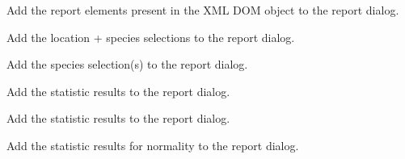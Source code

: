\documentclass[letterpaper,10pt,english]{sphinxmanual}
\begin{document}
\begin{fulllineitems}
\begin{fulllineitems}
\label{setlyze/gui:setlyze.gui.DisplayReport.add_report_elements}
Add the report elements present in the XML DOM object to the
report dialog.

\end{fulllineitems}


\begin{fulllineitems}
\label{setlyze/gui:setlyze.gui.DisplayReport.add_selections}
Add the location + species selections to the report dialog.

\end{fulllineitems}


\begin{fulllineitems}
\label{setlyze/gui:setlyze.gui.DisplayReport.add_species_selections}
Add the species selection(s) to the report dialog.

\end{fulllineitems}


\begin{fulllineitems}
\label{setlyze/gui:setlyze.gui.DisplayReport.add_statistics_chisq_ratios}
Add the statistic results to the report dialog.

\end{fulllineitems}


\begin{fulllineitems}
\label{setlyze/gui:setlyze.gui.DisplayReport.add_statistics_chisq_spots}
Add the statistic results to the report dialog.

\end{fulllineitems}


\begin{fulllineitems}
\label{setlyze/gui:setlyze.gui.DisplayReport.add_statistics_normality}
Add the statistic results for normality to the report dialog.


\end{fulllineitems}
\end{fulllineitems}
\end{document}
